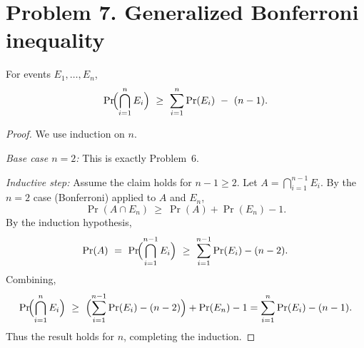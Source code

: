 
\section*{Problem 7. Generalized Bonferroni inequality}

For events $E_1,\dots,E_n$,
\[
\Pr\!\Bigl(\bigcap_{i=1}^n E_i\Bigr)\ \ge\ \sum_{i=1}^n \Pr(E_i)\ -\ (n-1).
\]

\begin{proof}
We use induction on $n$.

\emph{Base case $n=2$:} This is exactly Problem~6.

\emph{Inductive step:} Assume the claim holds for $n-1\ge2$. Let
$A=\bigcap_{i=1}^{n-1}E_i$. By the $n=2$ case (Bonferroni) applied to $A$ and $E_n$,
\[
\Pr(A\cap E_n)\ \ge\ \Pr(A)+\Pr(E_n)-1.
\]
By the induction hypothesis,
\[
\Pr(A)\ =\ \Pr\!\Bigl(\bigcap_{i=1}^{n-1}E_i\Bigr)\ \ge\ \sum_{i=1}^{n-1}\Pr(E_i)-(n-2).
\]
Combining,
\[
\Pr\!\Bigl(\bigcap_{i=1}^{n}E_i\Bigr)\ \ge\
\Bigl(\sum_{i=1}^{n-1}\Pr(E_i)-(n-2)\Bigr)+\Pr(E_n)-1
=\sum_{i=1}^{n}\Pr(E_i)-(n-1).
\]
Thus the result holds for $n$, completing the induction.
\end{proof}
